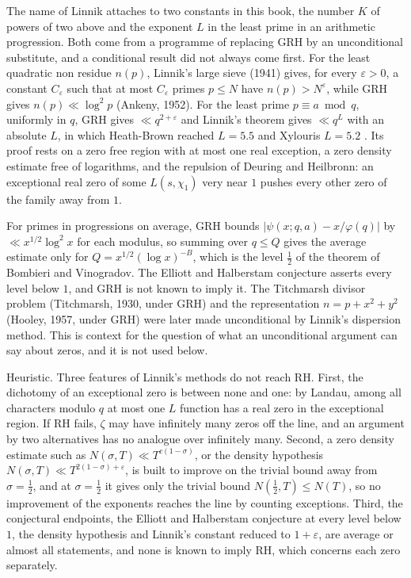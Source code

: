 The name of Linnik attaches to two constants in this book, the number $K$ of powers of two above and the exponent $L$ in the least prime in an arithmetic progression. Both come from a programme of replacing GRH by an unconditional substitute, and a conditional result did not always come first. For the least quadratic non residue $n(p)$, Linnik's large sieve (1941) gives, for every $\varepsilon>0$, a constant $C_\varepsilon$ such that at most $C_\varepsilon$ primes $p\le N$ have $n(p)>N^\varepsilon$, while GRH gives $n(p)\ll\log^2p$ (Ankeny, 1952). For the least prime $p\equiv a\bmod q$, uniformly in $q$, GRH gives $\ll q^{2+\varepsilon}$ and Linnik's theorem gives $\ll q^L$ with an absolute $L$, in which Heath-Brown reached $L=5.5$ and Xylouris $L=5.2$ \cite{Xylouris11}. Its proof rests on a zero free region with at most one real exception, a zero density estimate free of logarithms, and the repulsion of Deuring and Heilbronn: an exceptional real zero of some $L(s,\chi_1)$ very near $1$ pushes every other zero of the family away from $1$.

For primes in progressions on average, GRH bounds $|\psi(x;q,a)-x/\varphi(q)|$ by $\ll x^{1/2}\log^2x$ for each modulus, so summing over $q\le Q$ gives the average estimate only for $Q=x^{1/2}(\log x)^{-B}$, which is the level $\frac12$ of the theorem of Bombieri and Vinogradov. The Elliott and Halberstam conjecture asserts every level below $1$, and GRH is not known to imply it. The Titchmarsh divisor problem (Titchmarsh, 1930, under GRH) and the representation $n=p+x^2+y^2$ (Hooley, 1957, under GRH) were later made unconditional by Linnik's dispersion method. This is context for the question of what an unconditional argument can say about zeros, and it is not used below.

\begin{remark}\label{xi:rem:linnikstops}
Heuristic. Three features of Linnik's methods do not reach RH. First, the dichotomy of an exceptional zero is between none and one: by Landau, among all characters modulo $q$ at most one $L$ function has a real zero in the exceptional region. If RH fails, $\zeta$ may have infinitely many zeros off the line, and an argument by two alternatives has no analogue over infinitely many. Second, a zero density estimate such as $N(\sigma,T)\ll T^{c(1-\sigma)}$, or the density hypothesis $N(\sigma,T)\ll T^{2(1-\sigma)+\varepsilon}$, is built to improve on the trivial bound away from $\sigma=\frac12$, and at $\sigma=\frac12$ it gives only the trivial bound $N(\frac12,T)\le N(T)$, so no improvement of the exponents reaches the line by counting exceptions. Third, the conjectural endpoints, the Elliott and Halberstam conjecture at every level below $1$, the density hypothesis and Linnik's constant reduced to $1+\varepsilon$, are average or almost all statements, and none is known to imply RH, which concerns each zero separately.
\end{remark}

